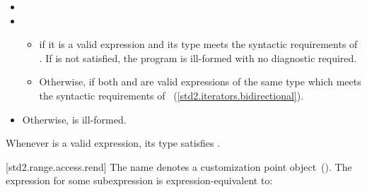 \begin{itemize}
\item

\item {}
  \begin{itemize}
  \item
      if it is a valid expression and its type  meets the
    syntactic requirements of . If 
    is not satisfied, the program is ill-formed with no diagnostic
    required.

  \item
    Otherwise,  if both
     and  are valid expressions of the same
    type  which meets the syntactic requirements of
    ~(\ref{std2.iterators.bidirectional}).
  \end{itemize}

\item
  Otherwise,  is ill-formed.
\end{itemize}

\pnum
\enternote Whenever  is a valid expression, its
type satisfies . \exitnote

[std2.range.access.rend]{}
\pnum
The name  denotes a customization point
object~(). The expression
 for some subexpression  is expression-equivalent to:

